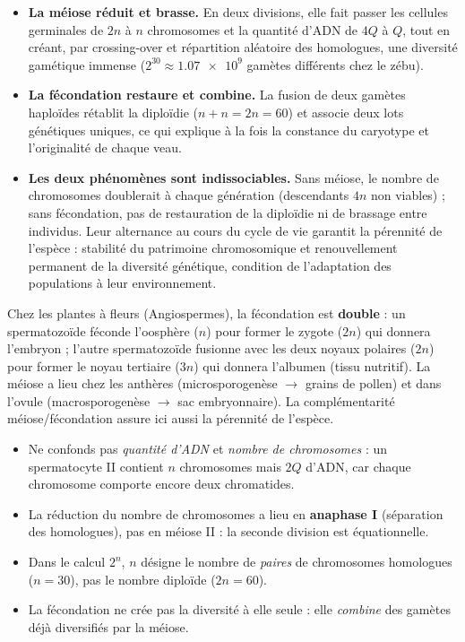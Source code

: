 \documentclass[11pt]{article}
\newcommand{\cle}[1]{{\popxbold\color{popdark}#1}}
\begin{document}
\begin{itemize}
\item \textbf{La méiose réduit et brasse.} En deux divisions, elle fait passer les cellules germinales de $2n$ à $n$ chromosomes et la quantité d'ADN de $4Q$ à $Q$, tout en créant, par crossing-over et répartition aléatoire des homologues, une diversité gamétique immense ($2^{30} \approx \num{1,07e9}$ gamètes différents chez le zébu).
\item \textbf{La fécondation restaure et combine.} La fusion de deux gamètes haploïdes rétablit la diploïdie ($n + n = 2n = 60$) et associe deux lots génétiques uniques, ce qui explique à la fois la constance du caryotype et l'originalité de chaque veau.
\item \textbf{Les deux phénomènes sont indissociables.} Sans méiose, le nombre de chromosomes doublerait à chaque génération (descendants $4n$ non viables) ; sans fécondation, pas de restauration de la diploïdie ni de brassage entre individus. Leur alternance au cours du cycle de vie garantit la \cle{pérennité de l'espèce} : stabilité du patrimoine chromosomique et renouvellement permanent de la diversité génétique, condition de l'adaptation des populations à leur environnement.
\end{itemize}

\begin{savaistu}
Chez les plantes à fleurs (Angiospermes), la fécondation est \textbf{double} : un spermatozoïde féconde l'oosphère ($n$) pour former le zygote ($2n$) qui donnera l'embryon ; l'autre spermatozoïde fusionne avec les deux noyaux polaires ($2n$) pour former le noyau tertiaire ($3n$) qui donnera l'albumen (tissu nutritif). La méiose a lieu chez les anthères (microsporogenèse $\rightarrow$ grains de pollen) et dans l'ovule (macrosporogenèse $\rightarrow$ sac embryonnaire). La complémentarité méiose/fécondation assure ici aussi la pérennité de l'espèce.
\end{savaistu}

\begin{attention}
\begin{itemize}
\item Ne confonds pas \emph{quantité d'ADN} et \emph{nombre de chromosomes} : un spermatocyte II contient $n$ chromosomes mais $2Q$ d'ADN, car chaque chromosome comporte encore deux chromatides.
\item La réduction du nombre de chromosomes a lieu en \textbf{anaphase I} (séparation des homologues), pas en méiose II : la seconde division est équationnelle.
\item Dans le calcul $2^{n}$, $n$ désigne le nombre de \emph{paires} de chromosomes homologues ($n = 30$), pas le nombre diploïde ($2n = 60$).
\item La fécondation ne \og crée \fg{} pas la diversité à elle seule : elle \emph{combine} des gamètes déjà diversifiés par la méiose.
\end{itemize}
\end{attention}
\end{document}
